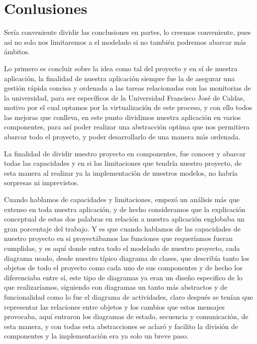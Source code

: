 \chapter{Conlusiones}
Sería conveniente dividir las conclusiones en partes, lo creemos conveniente, pues así no solo nos limitaremos a el modelado si no también podremos abarcar más ámbitos. 

Lo primero es concluir sobre la idea como tal del proyecto y en sí de nuestra aplicación, la finalidad de nuestra aplicación siempre fue la de asegurar una gestión rápida concisa y ordenada a las tareas relacionadas con las monitorias de la universidad, para ser específicos de la Universidad Francisco José de Caldas, motivo por el cual optamos por la virtualización de este proceso, y con ello todos las mejoras que conlleva, en este punto dividimos nuestra aplicación en varios componentes, para así poder realizar una abstracción optima que nos permitiera abarcar todo el proyecto, y poder desarrollarlo de una manera más ordenada. 

La finalidad de dividir nuestro proyecto en componentes, fue conocer y abarcar todas las capacidades y en si las limitaciones que tendría nuestro proyecto, de esta manera al realizar ya la implementación de nuestros modelos, no habría sorpresas ni imprevistos. 

Cuando hablamos de capacidades y limitaciones, empezó un análisis más que extenso en toda nuestra aplicación, y de hecho consideramos que la explicación conceptual de estas dos palabras en relación a nuestra aplicación englobaba un gran porcentaje del trabajo. Y es que cuando hablamos de las capacidades de nuestro proyecto en si proyectábamos las funciones que requeríamos fueran cumplidas, y es aquí donde entra todo el modelado de nuestro proyecto, cada diagrama usado, desde nuestro típico diagrama de clases, que describía tanto los objetos de todo el proyecto como cada uno de sus componentes y de hecho los diferenciaba entre sí, este tipo de diagramas ya eran un diseño especifico de lo que realizaríamos, siguiendo con diagramas un tanto más abstractos y de funcionalidad como lo fue el diagrama de actividades, claro después se tenían que representar las relaciones entre objetos y los cambios que estos mensajes provocaba, aquí entraron los diagramas de estado, secuencia y comunicación, de esta manera, y con todas esta abstracciones se aclaró y facilito la división de componentes y la implementación era ya solo un breve paso. 

